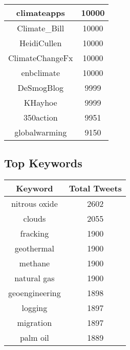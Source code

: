 \documentclass{article}\usepackage[T1]{fontenc}
\begin{document}
\begin{tabular}{|c|c|}
 \hline
climateapps & 10000\\ 
 \hline
Climate\_Bill & 10000\\ 
 \hline
HeidiCullen & 10000\\ 
 \hline
ClimateChangeFx & 10000\\ 
 \hline
enbclimate & 10000\\ 
 \hline
DeSmogBlog & 9999\\ 
 \hline
KHayhoe & 9999\\ 
 \hline
350action & 9951\\ 
 \hline
globalwarming & 9150\\ 
 \hline
\end{tabular}\subsection*{Top Keywords}\begin{tabular}{|c|c|}         \hline         Keyword & Total Tweets \\ 
 \hline
nitrous oxide & 2602\\ 
 \hline
clouds & 2055\\ 
 \hline
fracking & 1900\\ 
 \hline
geothermal & 1900\\ 
 \hline
methane & 1900\\ 
 \hline
natural gas & 1900\\ 
 \hline
geoengineering & 1898\\ 
 \hline
logging & 1897\\ 
 \hline
migration & 1897\\ 
 \hline
palm oil & 1889\\ 
 \hline
\end{tabular}
\end{document}
